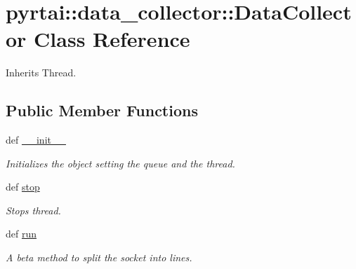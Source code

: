 \hypertarget{classpyrtai_1_1data__collector_1_1_data_collector}{
\section{pyrtai\-:\-:data\-\_\-collector\-:\-:\-Data\-Collector \-Class \-Reference}
\label{classpyrtai_1_1data__collector_1_1_data_collector}
}


\-Inherits \-Thread.

\subsection*{\-Public \-Member \-Functions}
\begin{DoxyCompactItemize}
\item 
def \hyperlink{classpyrtai_1_1data__collector_1_1_data_collector_aa03f22027ac2ecdf41d86e79b42cfce9}{\-\_\-\-\_\-init\-\_\-\-\_\-}
\begin{DoxyCompactList}\small\item\em \-Initializes the object setting the queue and the thread. \end{DoxyCompactList}\item 
def \hyperlink{classpyrtai_1_1data__collector_1_1_data_collector_a59f06d7c9085e6aac32a87f4e328c8e3}{stop}
\begin{DoxyCompactList}\small\item\em \-Stops thread. \end{DoxyCompactList}\item 
def \hyperlink{classpyrtai_1_1data__collector_1_1_data_collector_ae84a574793234cd60a4d22619373f3e7}{run}
\begin{DoxyCompactList}\small\item\em \-A beta method to split the socket into lines. \end{DoxyCompactList}\end{DoxyCompactItemize}
